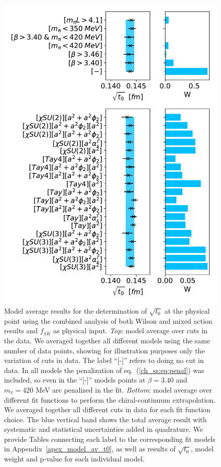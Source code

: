 \begin{figure}
    \centering
    \includegraphics[width=1.\textwidth]{./cap5/figs/BMA_comb_subav_c=1_cphi=0.0035.pdf}
    \caption{Model average results for the determination of $\sqrt{t_0}$ at the physical point using the combined analysis of both Wilson and mixed action results and $f_{\pi K}$ as physical input. \textit{Top}: model average over cuts in the data. We averaged together all different models using the same number of data points, showing for illustration purposes only the variation of cuts in data. The label ``[-]'' refers to doing no cut in data. In all models the penalization of eq.~(\ref{ch_ss:eq:penal}) was included, so even in the ``[-]'' models points at $\beta=3.40$ and $m_{\pi}=420$ MeV are penalized in the fit. \textit{Bottom}: model average over different fit functions to perform the chiral-continuum extrapolation. We averaged together all different cuts in data for each fit function choice. The blue vertical band shows the total average result with systematic and statistical uncertainties added in quadrature. We provide Tables connecting each label to the corresponding fit models in Appendix~\ref{apex_model_av_t0}, as well as results of $\sqrt{t_0}$, model weight and p-value for each individual model.}
    \label{ch_ss:fig:BMA_comb}
\end{figure}

